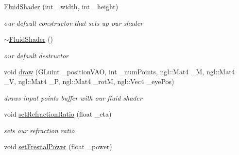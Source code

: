 \begin{DoxyCompactItemize}
\item 
\hyperlink{class_fluid_shader_ad3f76a7573c376b87189c0074d323e19}{Fluid\-Shader} (int \-\_\-width, int \-\_\-height)
\begin{DoxyCompactList}\small\item\em our default constructor that sets up our shader \end{DoxyCompactList}\item 
\hypertarget{class_fluid_shader_a00151325231de231c26c85bde9a7587d}{\hyperlink{class_fluid_shader_a00151325231de231c26c85bde9a7587d}{$\sim$\-Fluid\-Shader} ()}\label{class_fluid_shader_a00151325231de231c26c85bde9a7587d}

\begin{DoxyCompactList}\small\item\em our default destructor \end{DoxyCompactList}\item 
void \hyperlink{class_fluid_shader_ae4a324bbc4f7926bab3d45fb58ba59f6}{draw} (G\-Luint \-\_\-position\-V\-A\-O, int \-\_\-num\-Points, ngl\-::\-Mat4 \-\_\-\-M, ngl\-::\-Mat4 \-\_\-\-V, ngl\-::\-Mat4 \-\_\-\-P, ngl\-::\-Mat4 \-\_\-rot\-M, ngl\-::\-Vec4 \-\_\-eye\-Pos)
\begin{DoxyCompactList}\small\item\em draws input points buffer with our fluid shader \end{DoxyCompactList}\item 
\hypertarget{class_fluid_shader_ae91addca716706b77c3d78df77bf9860}{void \hyperlink{class_fluid_shader_ae91addca716706b77c3d78df77bf9860}{set\-Refraction\-Ratio} (float \-\_\-eta)}\label{class_fluid_shader_ae91addca716706b77c3d78df77bf9860}

\begin{DoxyCompactList}\small\item\em sets our refraction ratio \end{DoxyCompactList}\item 
\hypertarget{class_fluid_shader_ae02755692742b4c8e5fb5ed139709a42}{void \hyperlink{class_fluid_shader_ae02755692742b4c8e5fb5ed139709a42}{set\-Fresnal\-Power} (float \-\_\-power)}\label{class_fluid_shader_ae02755692742b4c8e5fb5ed139709a42}


\end{DoxyCompactItemize}
